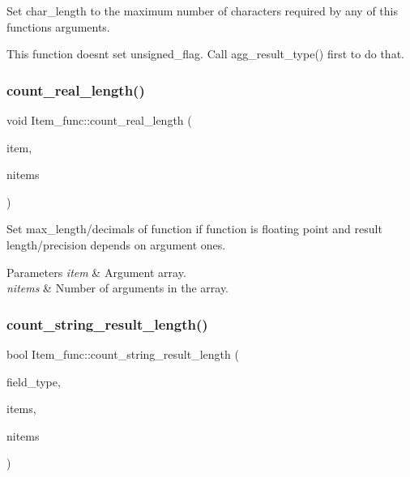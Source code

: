 Set char\+\_\+length to the maximum number of characters required by any of this function\textquotesingle{}s arguments.

This function doesn\textquotesingle{}t set unsigned\+\_\+flag. Call agg\+\_\+result\+\_\+type() first to do that. \mbox{\label{classItem__func_a76b738e84b242f2bebcca16d69bae60a}} 
\subsubsection{\texorpdfstring{count\+\_\+real\+\_\+length()}{count\_real\_length()}}
{\footnotesize\ttfamily void Item\+\_\+func\+::count\+\_\+real\+\_\+length (\begin{DoxyParamCaption}\item[{\mbox{\hyperlink{classItem}{Item}} $\ast$$\ast$}]{item,  }\item[{uint}]{nitems }\end{DoxyParamCaption})}

Set max\+\_\+length/decimals of function if function is floating point and result length/precision depends on argument ones.


\begin{DoxyParams}{Parameters}
{\em item} & Argument array. \\
\hline
{\em nitems} & Number of arguments in the array. \\
\hline
\end{DoxyParams}
\mbox{\label{classItem__func_a1ae5c3d14e9920407d536a8ce660b7fb}} 
\subsubsection{\texorpdfstring{count\+\_\+string\+\_\+result\+\_\+length()}{count\_string\_result\_length()}}
{\footnotesize\ttfamily bool Item\+\_\+func\+::count\+\_\+string\+\_\+result\+\_\+length (\begin{DoxyParamCaption}\item[{enum\+\_\+field\+\_\+types}]{field\+\_\+type,  }\item[{\mbox{\hyperlink{classItem}{Item}} $\ast$$\ast$}]{items,  }\item[{uint}]{nitems }\end{DoxyParamCaption})}

